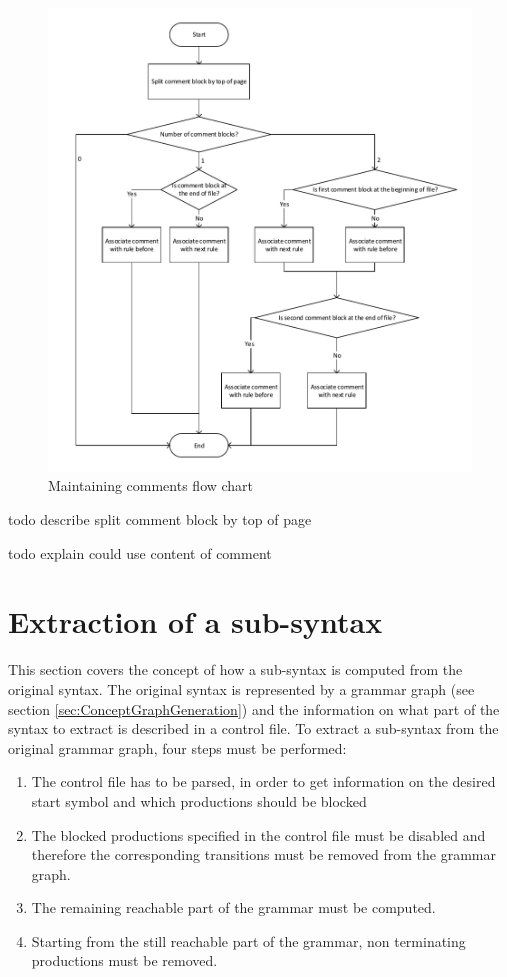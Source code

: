 \begin{figure}[H]
\centering
\includegraphics[width=1\textwidth]{images/Concept_maintaining_comments.pdf}
\caption{Maintaining comments flow chart}
\label{fig:ConceptMaintainingComments}
\end{figure}
todo describe split comment block by top of page

todo explain could use content of comment

\section{Extraction of a sub-syntax}\label{sec:ConceptExtractReducedGrammar}
This section covers the concept of how a sub-syntax is computed from the original syntax.
The original syntax is represented by a grammar graph (see section \ref{sec:ConceptGraphGeneration}) and the information on what part of the syntax to extract is described in a control file.
To extract a sub-syntax from the original grammar graph, four steps must be performed:
\begin{enumerate}%
	\item The control file has to be parsed, in order to get information on the desired start symbol and which productions should be blocked
	\item The blocked productions specified in the control file must be disabled and therefore the corresponding transitions must be removed from the grammar graph.
	\item The remaining reachable part of the grammar must be computed.
	\item Starting from the still reachable part of the grammar, non terminating productions must be removed.
\end{enumerate}
